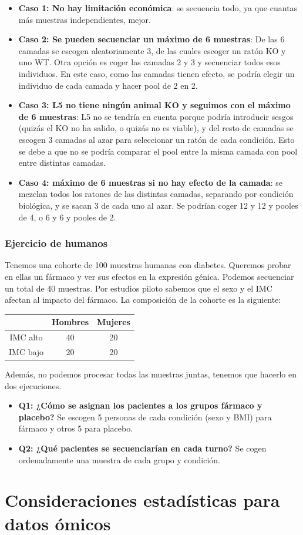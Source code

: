 \begin{itemize}
\item \textbf{Caso 1: No hay limitación económica}: se secuencia todo, ya que cuantas más muestras independientes, mejor.
\item \textbf{Caso 2: Se pueden secuenciar un máximo de 6 muestras}: De las 6 camadas se escogen aleatoriamente 3, de las cuales escoger un ratón KO y uno WT. Otra opción es coger las camadas 2 y 3 y secuenciar todos esos individuos. En este caso, como las camadas tienen efecto, se podría elegir un individuo de cada camada y hacer pool de 2 en 2. 
\item \textbf{Caso 3: L5 no tiene ningún animal KO y seguimos con el máximo de 6 muestras}: L5 no se tendría en cuenta porque podría introducir sesgos (quizás el KO no ha salido, o quizás no es viable), y del resto de camadas se escogen 3 camadas al azar para seleccionar un ratón de cada condición. Esto se debe a que no se podría comparar el pool entre la misma camada con pool entre distintas camadas.
\item \textbf{Caso 4: máximo de 6 muestras si no hay efecto de la camada}: se mezclan todos los ratones de las distintas camadas, separando por condición biológica, y se sacan 3 de cada uno al azar. Se podrían coger 12 y 12 y pooles de 4, o 6 y 6 y pooles de 2.
\end{itemize}

\subsubsection{Ejercicio de humanos}
Tenemos una cohorte de 100 muestras humanas con diabetes. Queremos probar en ellas un fármaco y ver sus efectos en la expresión génica. Podemos secuenciar un total de 40 muestras. Por estudios piloto sabemos que el sexo y el IMC afectan al impacto del fármaco. La composición de la cohorte es la siguiente:
\begin{table}[h]
\centering
\begin{tabular}{c | c c}
 & Hombres & Mujeres \\ \hline
IMC alto & 40 & 20 \\
IMC bajo & 20 & 20
\end{tabular}
\end{table}
Además, no podemos procesar todas las muestras juntas, tenemos que hacerlo en dos ejecuciones.
\begin{itemize}
\item \textbf{Q1: ¿Cómo se asignan los pacientes a los grupos fármaco y placebo?} Se escogen 5 personas de cada condición (sexo y BMI) para fármaco y otros 5 para placebo. 
\item \textbf{Q2: ¿Qué pacientes se secuenciarían en cada turno?} Se cogen ordenadamente una muestra de cada grupo y condición.
\end{itemize}

\section{Consideraciones estadísticas para datos ómicos}